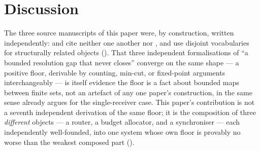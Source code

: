 \documentclass[11pt,twocolumn,a4paper]{article}
\theoremstyle{rdm}
\theoremstyle{definition}
\theoremstyle{remark}
\begin{document}
\section{Discussion}
\label{sec:discussion}

The three source manuscripts of this paper were, by construction, written
independently: \citet{sachikonye-federated-context-closure} and
\citet{sachikonye-split-attention} cite neither one another nor
\citet{sachikonye-accountable-compilation}, and use disjoint vocabularies
for structurally related objects (). That three
independent formalisations of ``a bounded resolution gap that never
closes'' converge on the same shape — a positive floor, derivable by
counting, min-cut, or fixed-point arguments interchangeably — is itself
evidence the floor is a fact about bounded maps between finite sets, not an
artefact of any one paper's construction, in the same sense
\citet[Rem.~5.1]{sachikonye-accountable-compilation} already argues for the
single-receiver case. This paper's contribution is not a seventh
independent derivation of the same floor; it is the composition of three
\emph{different} objects — a router, a budget allocator, and a
synchroniser — each independently well-founded, into one system whose own
floor is provably no worse than the weakest composed part
().
\end{document}
